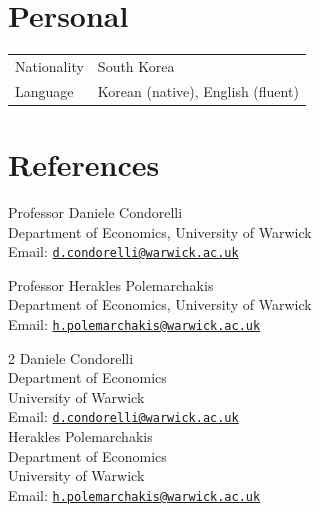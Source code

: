 \documentclass[11pt]{article}
\newlength{\oneli}
\begin{document}
\section*{Personal}
\begin{tabular}{@{}p{7em}l@{}}
{Nationality} 	& South Korea\\
{Language}    & Korean (native), English (fluent)\\
\end{tabular}




\section*{References}

Professor {Daniele Condorelli} \\
Department of Economics, University of Warwick\\
Email: \href{mailto:d.condorelli@warwick.ac.uk}{\texttt{d.condorelli@warwick.ac.uk}}

\vspace{\oneli}
Professor {Herakles Polemarchakis}\\
Department of Economics, University of Warwick\\
Email: \href{mailto:h.polemarchakis@warwick.ac.uk}{\texttt{h.polemarchakis@warwick.ac.uk}}

\vspace{\oneli}

\iffalse
\setlength{\columnsep}{35pt}
\setlength\multicolsep{0pt}
\begin{multicols}{2}
{Daniele Condorelli} \\
Department of Economics\\ University of Warwick\\
Email: \href{mailto:d.condorelli@warwick.ac.uk}{\texttt{d.condorelli@warwick.ac.uk}}\\[11pt]
{Herakles Polemarchakis}\\
Department of Economics\\ University of Warwick\\
Email: \href{mailto:h.polemarchakis@warwick.ac.uk}{\texttt{h.polemarchakis@warwick.ac.uk}}
\end{multicols}
\vspace{\oneli}
\end{document}
